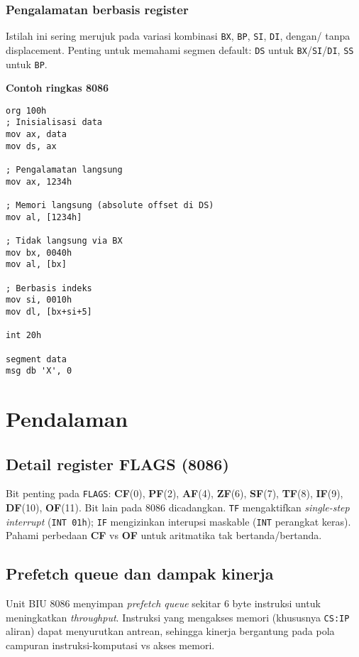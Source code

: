 \subsubsection{Pengalamatan berbasis register}
Istilah ini sering merujuk pada variasi kombinasi \texttt{BX}, \texttt{BP}, \texttt{SI}, \texttt{DI}, dengan/ tanpa displacement. Penting untuk memahami segmen default: \texttt{DS} untuk \texttt{BX}/\texttt{SI}/\texttt{DI}, \texttt{SS} untuk \texttt{BP}.

\noindent\textbf{Contoh ringkas 8086}
\begin{verbatim}
org 100h
; Inisialisasi data
mov ax, data
mov ds, ax

; Pengalamatan langsung
mov ax, 1234h

; Memori langsung (absolute offset di DS)
mov al, [1234h]

; Tidak langsung via BX
mov bx, 0040h
mov al, [bx]

; Berbasis indeks
mov si, 0010h
mov dl, [bx+si+5]

int 20h

segment data
msg db 'X', 0
\end{verbatim}
\section{Pendalaman}\label{sec:8086-pendalaman}
\subsection{Detail register FLAGS (8086)}
Bit penting pada \texttt{FLAGS}: \textbf{CF}(0), \textbf{PF}(2), \textbf{AF}(4), \textbf{ZF}(6), \textbf{SF}(7), \textbf{TF}(8), \textbf{IF}(9), \textbf{DF}(10), \textbf{OF}(11). Bit lain pada 8086 dicadangkan. \texttt{TF} mengaktifkan \textit{single-step interrupt} (\texttt{INT 01h}); \texttt{IF} mengizinkan interupsi maskable (\texttt{INT} perangkat keras). Pahami perbedaan \textbf{CF} vs \textbf{OF} untuk aritmatika tak bertanda/bertanda. \cite{intel2019manual32,wiki_8086}

\subsection{Prefetch queue dan dampak kinerja}
Unit BIU 8086 menyimpan \textit{prefetch queue} sekitar 6 byte instruksi untuk meningkatkan \textit{throughput}. Instruksi yang mengakses memori (khususnya \texttt{CS:IP} aliran) dapat menyurutkan antrean, sehingga kinerja bergantung pada pola campuran instruksi-komputasi vs akses memori. \cite{wiki_8086}

